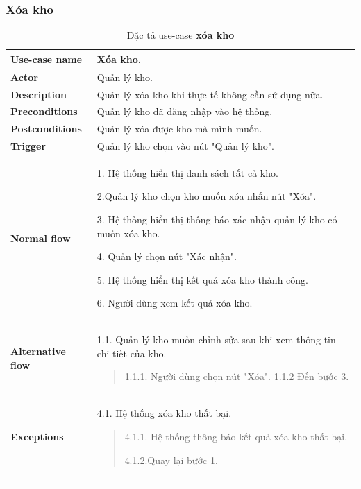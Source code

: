 \subsubsection{Xóa kho}
{
    \setlength\extrarowheight{6pt}
    \begin{longtable}{| p{} | p{} |}
        \hline
        \textbf{Use-case name}
         &
        Xóa kho.
        \\
        \hline
        \textbf{Actor}
         &
        Quản lý kho.
        \\
        \hline
        \textbf{Description}
         &
        Quản lý xóa kho khi thực tế không cần sử dụng nữa.
        \\
        \hline
        \textbf{Preconditions}
         &
        Quản lý kho đã đăng nhập vào hệ thống.
        \\
        \hline
        \textbf{Postconditions}
         &
        Quản lý xóa được kho mà mình muốn.
        \\
        \hline
        \textbf{Trigger}
         &
        Quản lý kho chọn vào nút "Quản lý kho".
        \\
        \hline
        \begin{flushleft}
            \textbf{Normal flow}
        \end{flushleft}
         &
        1. Hệ thống hiển thị danh sách tất cả kho.

        2.Quản lý kho chọn kho muốn xóa nhấn nút "Xóa".

        3. Hệ thống hiển thị thông báo xác nhận quản lý kho có muốn xóa kho.

        4. Quản lý chọn nút "Xác nhận".

        5. Hệ thống hiển thị kết quả xóa kho thành công.

        6. Người dùng xem kết quả xóa kho.
        \\
        \hline
        \begin{flushleft}
            \textbf{Alternative flow}

        \end{flushleft}
         &
        1.1. Quản lý kho muốn chỉnh sửa sau khi xem thông tin chi tiết của kho.
        \begin{quote}
            1.1.1. Người dùng chọn nút "Xóa".
            1.1.2 Đến bước 3.
        \end{quote}
        \\
        \hline
        \begin{flushleft}
            \textbf{Exceptions}
        \end{flushleft}
         &
        4.1. Hệ thống xóa kho thất bại.
        \begin{quote}
            4.1.1. Hệ thống thông báo kết quả xóa kho thất bại.

            4.1.2.Quay lại bước 1.
        \end{quote}
        \\
        \hline
        \caption{Đặc tả use-case \textbf{xóa kho}}
    \end{longtable}
}



